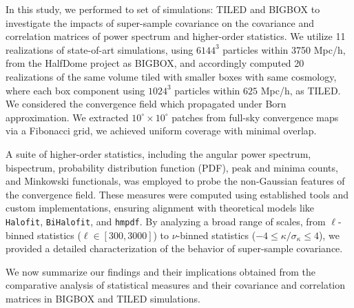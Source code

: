 In this study, we performed to set of simulations: TILED and BIGBOX to investigate the impacts of super-sample covariance on the covariance and correlation matrices of power spectrum and higher-order statistics. We utilize 11 realizations of state-of-art simulations, using $6144^3$ particles within 3750 Mpc/h, from the HalfDome project \citep{2024arXiv240717462B} as BIGBOX, and accordingly computed 20 realizations of the same volume tiled with smaller boxes with same cosmology, where each box component using $1024^3$ particles within $625$ Mpc/h, as TILED. We considered the convergence field which propagated under Born approximation. We extracted $10^\circ \times 10^\circ$ patches from full-sky convergence maps via a Fibonacci grid, we achieved uniform coverage with minimal overlap. 

A suite of higher-order statistics, including the angular power spectrum, bispectrum, probability distribution function (PDF), peak and minima counts, and Minkowski functionals, was employed to probe the non-Gaussian features of the convergence field. These measures were  computed using established tools and custom implementations, ensuring alignment with theoretical models like \texttt{Halofit}, \texttt{BiHalofit}, and \texttt{hmpdf}. By analyzing a broad range of scales, from $\ell$-binned statistics ($\ell \in [300,3000]$) to $\nu$-binned statistics ($-4 \leq \kappa/\sigma_\kappa \leq 4$), we provided a detailed characterization of the behavior of super-sample covariance.

We now summarize our findings and their implications obtained from the comparative analysis of statistical measures and their covariance and correlation matrices in BIGBOX and TILED simulations.

